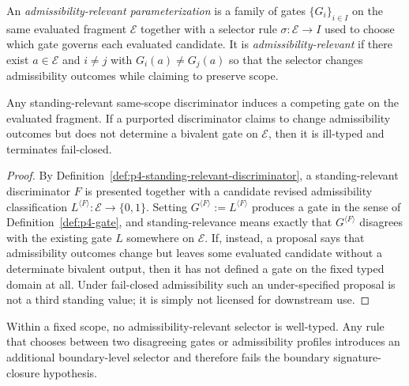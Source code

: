 \begin{manualdefinition}
\label{def:p4-admissibility-parameterization}
An \emph{admissibility-relevant parameterization} is a family of gates $\{G_i\}_{i\in I}$ on the same evaluated fragment $\mathcal E$ together with a selector rule $\sigma:\mathcal E\to I$ used to choose which gate governs each evaluated candidate. It is \emph{admissibility-relevant} if there exist $a\in\mathcal E$ and $i\neq j$ with $G_i(a)\neq G_j(a)$ so that the selector changes admissibility outcomes while claiming to preserve scope.
\end{manualdefinition}

\begin{manuallemma}
\label{lem:p4-gate-induction}
Any standing-relevant same-scope discriminator induces a competing gate on the evaluated fragment. If a purported discriminator claims to change admissibility outcomes but does not determine a bivalent gate on $\mathcal E$, then it is ill-typed and terminates fail-closed.
\end{manuallemma}

\begin{proof}
By Definition~\ref{def:p4-standing-relevant-discriminator}, a standing-relevant discriminator $F$ is presented together with a candidate revised admissibility classification $L^{\langle F\rangle}:\mathcal E\to\{0,1\}$. Setting $G^{\langle F\rangle}:=L^{\langle F\rangle}$ produces a gate in the sense of Definition~\ref{def:p4-gate}, and standing-relevance means exactly that $G^{\langle F\rangle}$ disagrees with the existing gate $L$ somewhere on $\mathcal E$. If, instead, a proposal says that admissibility outcomes change but leaves some evaluated candidate without a determinate bivalent output, then it has not defined a gate on the fixed typed domain at all. Under fail-closed admissibility such an under-specified proposal is not a third standing value; it is simply not licensed for downstream use.
\end{proof}

\begin{manuallemma}
\label{lem:p4-no-selector}
Within a fixed scope, no admissibility-relevant selector is well-typed. Any rule that chooses between two disagreeing gates or admissibility profiles introduces an additional boundary-level selector and therefore fails the boundary signature-closure hypothesis.
\end{manuallemma}

